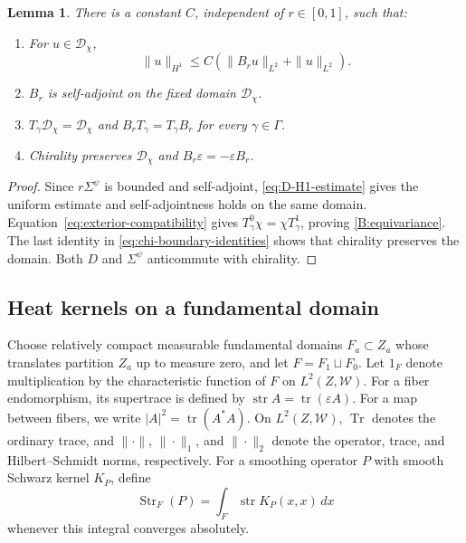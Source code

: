 \documentclass[12pt,reqno]{amsart}
\numberwithin{equation}{section}
\newtheorem{lemma}[theorem]{Lemma}
\theoremstyle{definition}
\newcommand{\Str}{\operatorname{Str}}
\newcommand{\Tr}{\operatorname{Tr}}
\newcommand{\tr}{\operatorname{tr}}
\newcommand{\str}{\operatorname{str}}
\newcommand{\cW}{\mathscr W}
\begin{document}
\begin{lemma}\label{lem:B-properties}
There is a constant $C$, independent of $r\in[0,1]$, such that:
\begin{enumerate}[label=\textup{(\roman*)},leftmargin=2.8em]
\item\label{B:H1}
For $u\in\mathcal D_\chi$,
\begin{equation}\label{eq:D-graph-estimate}
 \|u\|_{H^1}\leq C(\|B_ru\|_{L^2}+\|u\|_{L^2}).
\end{equation}
\item\label{B:selfadjoint}
$B_r$ is self-adjoint on the fixed domain $\mathcal D_\chi$.
\item\label{B:equivariance}
$T_\gamma\mathcal D_\chi=\mathcal D_\chi$ and
$B_rT_\gamma=T_\gamma B_r$ for every $\gamma\in\Gamma$.
\item\label{B:odd}
Chirality preserves $\mathcal D_\chi$ and
$B_r\varepsilon=-\varepsilon B_r$.
\end{enumerate}
\end{lemma}

\begin{proof}
Since $r\Sigma^\psi$ is bounded and self-adjoint, 
\eqref{eq:D-H1-estimate} gives the uniform estimate and
self-adjointness holds on the same domain.
Equation~\eqref{eq:exterior-compatibility} gives
$T^0_\gamma\chi=\chi T^1_\gamma$, proving \ref{B:equivariance}.
The last identity in \eqref{eq:chi-boundary-identities} shows that
chirality preserves the domain. Both $D$ and $\Sigma^\psi$ anticommute with chirality.
\end{proof}




\subsection{Heat kernels on a fundamental domain}\label{subsec:heat-supertrace}

Choose relatively compact measurable fundamental domains $F_a\subset Z_a$
whose translates partition $Z_a$ up to measure zero, and let
$F=F_1\sqcup F_0$.  Let $1_F$ denote multiplication by the characteristic function of
$F$ on $L^2(Z,\cW)$.  For a fiber endomorphism, its supertrace is defined by
$\str A=\tr(\varepsilon A)$. For a map between fibers, we write
$|A|^2=\tr(A^*A)$.  On $L^2(Z,\cW)$, $\Tr$ denotes the ordinary
trace, and $\|\cdot\|$, $\|\cdot\|_1$, and $\|\cdot\|_2$ denote
the operator, trace, and Hilbert--Schmidt norms, respectively.  For a smoothing
operator $P$ with smooth Schwarz kernel $K_P$, define
\[
 \Str_F(P)=\int_F\str K_P(x,x)\,dx
\]
whenever this integral converges absolutely. 
\end{document}
